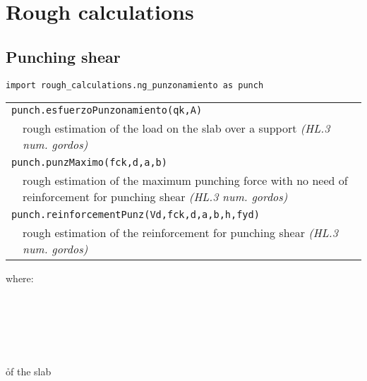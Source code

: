 \chapter{Rough calculations}
\section{Punching shear} 
\begin{verbatim}
import rough_calculations.ng_punzonamiento as punch
\end{verbatim}
\begin{center}
\begin{tabular}{p{3cm}p{9.5cm}}
\multicolumn{2}{l}{{\tt punch.esfuerzoPunzonamiento(qk,A)}} \\
& rough estimation of the load on the slab over a support \emph{(HL.3 num. gordos)}\\
\multicolumn{2}{l}{{\tt punch.punzMaximo(fck,d,a,b)}} \\
& rough estimation of the maximum punching force with no need of reinforcement for punching shear  \emph{(HL.3 num. gordos)}\\
\multicolumn{2}{l}{{\tt punch.reinforcementPunz(Vd,fck,d,a,b,h,fyd)}} \\
& rough estimation of the reinforcement for punching shear  \emph{(HL.3 num. gordos)} \\
\end{tabular}
\end{center}

where:
\begin{paramFuncTable}
\qkSlab{} \\
\ASupport{} \\
\fck{}\\
 \\
\abSupport{} \\
\h{of the slab} \\
 \\
\end{paramFuncTable}

